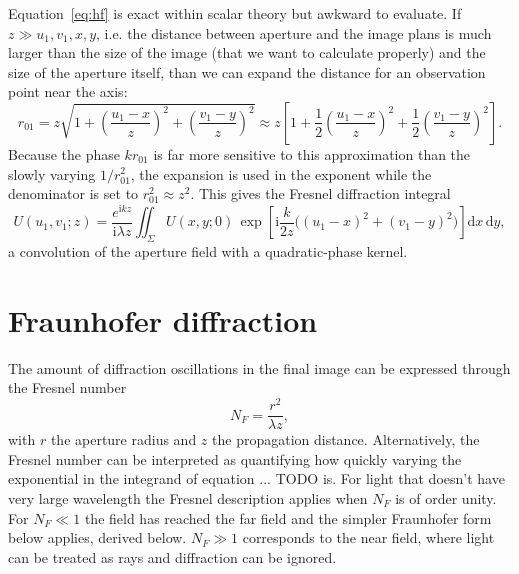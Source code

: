 \documentclass[11pt]{book}
\begin{document}
Equation~\eqref{eq:hf} is exact within scalar theory but awkward to evaluate. If $z\gg u_1,v_1,x,y$, i.e. the distance between aperture and the image plans is much larger than the size of the image (that we want to calculate properly) and the size of the aperture itself, than we can expand the distance for an observation point near the axis:
\begin{equation}
r_{01} = z\sqrt{1 + \left(\frac{u_1-x}{z}\right)^2 + \left(\frac{v_1-y}{z}\right)^2}
\approx z\left[1 + \frac{1}{2}\left(\frac{u_1-x}{z}\right)^2 + \frac{1}{2}\left(\frac{v_1-y}{z}\right)^2\right].
\label{eq:binomial}
\end{equation}
Because the phase $kr_{01}$ is far more sensitive to this approximation than the slowly varying $1/r_{01}^2$, the expansion is used in the exponent while the denominator is set to $r_{01}^2\approx z^2$. This gives the Fresnel diffraction integral
\begin{equation}
U(u_1,v_1;z) = \frac{e^{\mathrm{i}kz}}{\mathrm{i}\lambda z}\iint_\Sigma U(x,y;0)\,
\exp\!\left[\mathrm{i}\frac{k}{2z}\big((u_1-x)^2+(v_1-y)^2\big)\right]\mathrm{d}x\,\mathrm{d}y,
\label{eq:fresnel}
\end{equation}
a convolution of the aperture field with a quadratic-phase kernel. 

\section{Fraunhofer diffraction}
The amount of diffraction oscillations in the final image can be expressed through the Fresnel number
\begin{equation}
N_F = \frac{r^2}{\lambda z},
\label{eq:fresnelnumber}
\end{equation}
with $r$ the aperture radius and $z$ the propagation distance. Alternatively, the Fresnel number can be interpreted as quantifying how quickly varying the exponential in the integrand of equation ... TODO is. For light that doesn't have very large wavelength the Fresnel description applies when $N_F$ is of order unity. For $N_F\ll 1$ the field has reached the far field and the simpler Fraunhofer form below applies, derived below. $N_F\gg 1$ corresponds to the near field, where light can be treated as rays and diffraction can be ignored.
\end{document}
